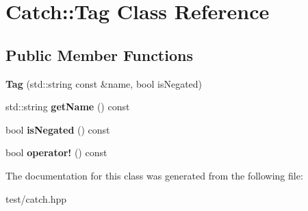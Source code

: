 \hypertarget{classCatch_1_1Tag}{}\section{Catch\+:\+:Tag Class Reference}
\label{classCatch_1_1Tag}
\subsection*{Public Member Functions}
\begin{DoxyCompactItemize}
\item 
{\bfseries Tag} (std\+::string const \&name, bool is\+Negated)\hypertarget{classCatch_1_1Tag_a3d43477e0f15d4baddc6f6d0943294ae}{}\label{classCatch_1_1Tag_a3d43477e0f15d4baddc6f6d0943294ae}

\item 
std\+::string {\bfseries get\+Name} () const \hypertarget{classCatch_1_1Tag_a4fabe27cb327c3221cf9f93573aaae96}{}\label{classCatch_1_1Tag_a4fabe27cb327c3221cf9f93573aaae96}

\item 
bool {\bfseries is\+Negated} () const \hypertarget{classCatch_1_1Tag_a437011d6ba5afc54c0e6649b7a200f26}{}\label{classCatch_1_1Tag_a437011d6ba5afc54c0e6649b7a200f26}

\item 
bool {\bfseries operator!} () const \hypertarget{classCatch_1_1Tag_aebcc5d6af02cbfdb27c6e9a0718787fa}{}\label{classCatch_1_1Tag_aebcc5d6af02cbfdb27c6e9a0718787fa}

\end{DoxyCompactItemize}


The documentation for this class was generated from the following file\+:\begin{DoxyCompactItemize}
\item 
test/catch.\+hpp\end{DoxyCompactItemize}
